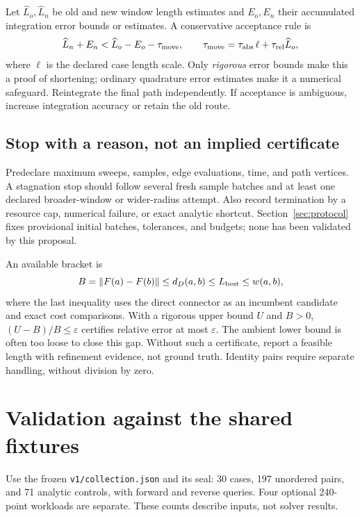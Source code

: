 \documentclass[11pt,letterpaper]{article}
\newcommand{\norm}[1]{\left\lVert#1\right\rVert}
\newcommand{\src}[1]{\nolinkurl{#1}}
\begin{document}
Let $\widehat L_o,\widehat L_n$ be old and new window length estimates and $E_o,E_n$ their accumulated integration error bounds or estimates. A conservative acceptance rule is
\begin{equation}\label{eq:accept}
 \widehat L_n+E_n < \widehat L_o-E_o-\tau_{\rm move},\qquad
 \tau_{\rm move}=\tau_{\rm abs}\,\ell+\tau_{\rm rel}\widehat L_o,
\end{equation}
where $\ell$ is the declared case length scale. Only \emph{rigorous} error bounds make this a proof of shortening; ordinary quadrature error estimates make it a numerical safeguard. Reintegrate the final path independently. If acceptance is ambiguous, increase integration accuracy or retain the old route.

\subsection{Stop with a reason, not an implied certificate}
Predeclare maximum sweeps, samples, edge evaluations, time, and path vertices. A stagnation stop should follow several fresh sample batches and at least one declared broader-window or wider-radius attempt. Also record termination by a resource cap, numerical failure, or exact analytic shortcut. Section~\ref{sec:protocol} fixes provisional initial batches, tolerances, and budgets; none has been validated by this proposal.

An available bracket is
\begin{equation}
 B=\norm{F(a)-F(b)}\le d_D(a,b)\le L_{\rm best}\le w(a,b),
\end{equation}
where the last inequality uses the direct connector as an incumbent candidate and exact cost comparisons. With a rigorous upper bound $U$ and $B>0$, $(U-B)/B\le\varepsilon$ certifies relative error at most $\varepsilon$. The ambient lower bound is often too loose to close this gap. Without such a certificate, report a feasible length with refinement evidence, not ground truth. Identity pairs require separate handling, without division by zero.

\clearpage
\section{Validation against the shared fixtures}
Use the frozen \src{v1/collection.json} and its seal: 30 cases, 197 unordered pairs, and 71 analytic controls, with forward and reverse queries. Four optional 240-point workloads are separate. These counts describe inputs, not solver results.
\end{document}
